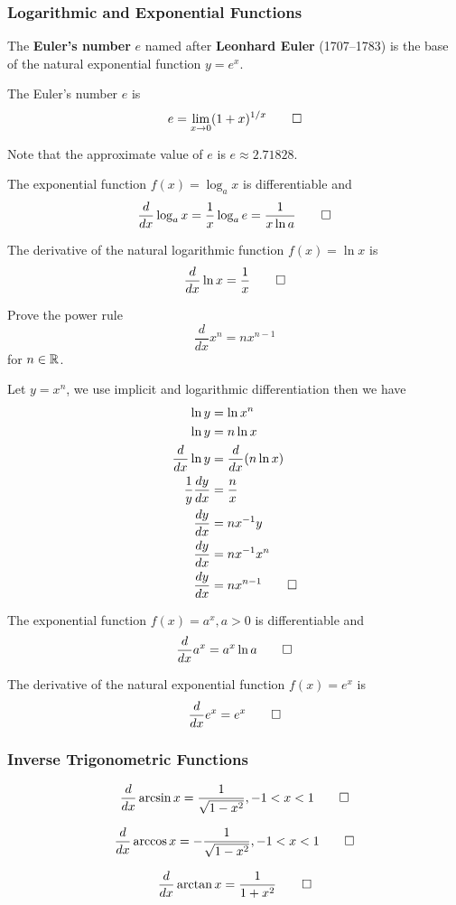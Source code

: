 \subsubsection{Logarithmic and Exponential Functions}
The \textbf{Euler's number} \(e\) named after \textbf{Leonhard Euler} (1707--1783)
is the base of the natural exponential function \(y=e^x\).
\begin{definition}
    The Euler's number \(e\) is \[e=\lim_{x\to 0}(1+x)^{1/x}\qedhere\]
\end{definition}
Note that the approximate value of \(e\) is \(e\approx2.71828\).
\begin{theorem}
    The exponential function \(f(x)=\log_a x\) is differentiable and
    \[\frac{d}{dx}\log_a x=\frac{1}{x}\log_a e=\frac{1}{x\ln a}\qedhere\]
\end{theorem}
\begin{theorem}
    The derivative of the natural logarithmic function \(f(x)=\ln x\) is
    \[\frac{d}{dx}\ln x=\frac{1}{x}\qedhere\]
\end{theorem}
\begin{problem}
    Prove the power rule \[\frac{d}{dx}x^n=nx^{n-1}\] for \(n\in\mathbb{R}\).
\end{problem}
\begin{solution}
    Let \(y=x^n\), we use implicit and logarithmic differentiation then we have
    \begin{align*}
        \ln y&=\ln x^n\\\ln y&=n\ln x\\\frac{d}{dx}\ln y&=\frac{d}{dx}(n\ln x)
        \\\frac{1}{y}\frac{dy}{dx}&=\frac{n}{x}\\\frac{dy}{dx}&=nx^{-1}y\\
        \frac{dy}{dx}&=nx^{-1}x^n\\\frac{dy}{dx}&=nx^{n-1}\qedhere
    \end{align*}
\end{solution}
\begin{theorem}
    The exponential function \(f(x)=a^x,a>0\) is differentiable and
    \[\frac{d}{dx}a^x=a^x\ln a\qedhere\]
\end{theorem}
\begin{theorem}
    The derivative of the natural exponential function \(f(x)=e^x\) is
    \[\frac{d}{dx}e^x=e^x\qedhere\]
\end{theorem}

\subsubsection{Inverse Trigonometric Functions}
\begin{theorem}
    \[\frac{d}{dx}\arcsin x=\frac{1}{\sqrt{1-x^2}},-1<x<1\qedhere\]
\end{theorem}
\begin{theorem}
    \[\frac{d}{dx}\arccos x=-\frac{1}{\sqrt{1-x^2}},-1<x<1\qedhere\]
\end{theorem}
\begin{theorem}
    \[\frac{d}{dx}\arctan x=\frac{1}{1+x^2}\qedhere\]
\end{theorem}